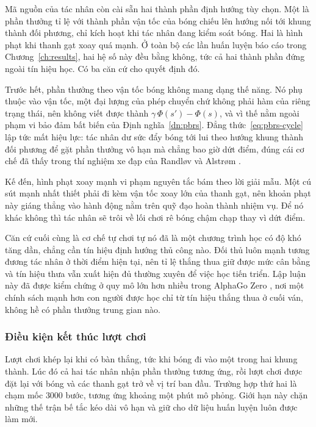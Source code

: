 \indent Mã nguồn của tác nhân còn cài sẵn hai thành phần định hướng tùy chọn. Một là phần
thưởng tỉ lệ với thành phần vận tốc của bóng chiếu lên hướng nối tới khung thành đối
phương, chỉ kích hoạt khi tác nhân đang kiểm soát bóng. Hai là hình phạt khi thanh gạt
xoay quá mạnh. Ở toàn bộ các lần huấn luyện báo cáo trong Chương~\ref{ch:results}, hai hệ
số này đều bằng không, tức cả hai thành phần đứng ngoài tín hiệu học. Có ba căn cứ cho
quyết định đó.

\indent Trước hết, phần thưởng theo vận tốc bóng không mang dạng thế năng. Nó phụ thuộc vào
vận tốc, một đại lượng của phép chuyển chứ không phải hàm của riêng trạng thái, nên không viết
được thành $\gamma\,\Phi(s') - \Phi(s)$, và vì thế nằm ngoài phạm vi bảo đảm
bất biến của Định nghĩa~\ref{dn:pbrs}. Đẳng thức~\eqref{eq:pbrs-cycle} lập tức mất hiệu
lực: tác nhân dư sức đẩy bóng tới lui theo hướng khung thành đối phương để gặt phần thưởng
vô hạn mà chẳng bao giờ dứt điểm, đúng cái cơ chế đã thấy trong thí nghiệm xe đạp của
Randløv và Alstrøm \cite{randlov1998learning}.

\indent Kế đến, hình phạt xoay mạnh vi phạm nguyên tắc bám theo lời giải mẫu. Một cú sút
mạnh nhất thiết phải đi kèm vận tốc xoay lớn của thanh gạt, nên khoản phạt này giáng thẳng
vào hành động nằm trên quỹ đạo hoàn thành nhiệm vụ. Để nó khác không thì tác nhân sẽ trôi
về lối chơi rê bóng chậm chạp thay vì dứt điểm.

\indent Căn cứ cuối cùng là cơ chế tự chơi tự nó đã là một chương trình học có độ khó tăng
dần, chẳng cần tín hiệu định hướng thủ công nào. Đối thủ luôn mạnh tương đương tác nhân ở
thời điểm hiện tại, nên tỉ lệ thắng thua giữ được mức cân bằng và tín hiệu thưa vẫn xuất
hiện đủ thường xuyên để việc học tiến triển. Lập luận này đã được kiểm chứng ở quy mô lớn
hơn nhiều trong AlphaGo Zero \cite{silver2017mastering}, nơi một chính sách mạnh hơn con
người được học chỉ từ tín hiệu thắng thua ở cuối ván, không hề có phần thưởng trung gian
nào.

\subsubsection{Điều kiện kết thúc lượt chơi}
\indent Lượt chơi khép lại khi có bàn thắng, tức khi bóng đi vào một trong hai khung
thành. Lúc đó cả hai tác nhân nhận phần thưởng tương ứng, rồi lượt chơi được đặt lại với
bóng và các thanh gạt trở về vị trí ban đầu. Trường hợp thứ hai là chạm mốc $3000$ bước,
tương ứng khoảng một phút mô phỏng. Giới hạn này chặn những thế trận bế tắc kéo dài vô hạn
và giữ cho dữ liệu huấn luyện luôn được làm mới.

